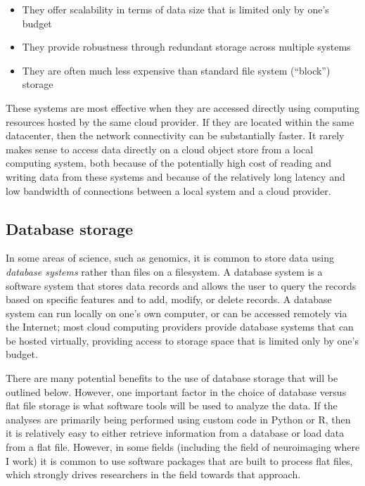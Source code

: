 \begin{itemize}
\item They offer scalability in terms of data size that is limited only by one's budget
\item They provide robustness through redundant storage across multiple systems
\item They are often much less expensive than standard file system (``block'') storage
\end{itemize}

These systems are most effective when they are accessed directly using computing resources hosted by the same cloud provider.  If they are located within the same datacenter, then the network connectivity can be substantially faster.  It rarely makes sense to access data directly on a cloud object store from a local computing system, both because of the potentially high cost of reading and writing data from these systems and because of the relatively long latency and low bandwidth of connections between a local system and a cloud provider.

\subsection{Database storage}

In some areas of science, such as genomics, it is common to store data using \textit{database systems} rather than files on a filesystem. A database system is a software system that stores data records and allows the user to query the records based on specific features and to add, modify, or delete records.  A database system can run locally on one's own computer, or can be accessed remotely via the Internet; most cloud computing providers provide database systems that can be hosted virtually, providing access to storage space that is limited only by one's budget.

There are many potential benefits to the use of database storage that will be outlined below. However, one important factor in the choice of database versus flat file storage is what software tools will be used to analyze the data.  If the analyses are primarily being performed using custom code in Python or R, then it is relatively easy to either retrieve information from a database or load data from a flat file.  However, in some fields (including the field of neuroimaging where I work) it is common to use software packages that are built to process flat files, which strongly drives researchers in the field towards that approach.

